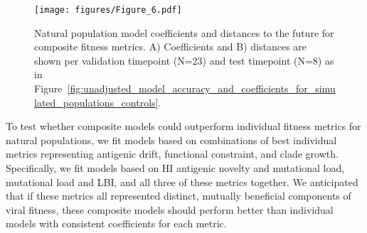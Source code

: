 \begin{figure}[htb]
  \texttt{[image: figures/Figure\_6.pdf]}
  \caption{
    Natural population model coefficients and distances to the future for composite fitness metrics.
    A) Coefficients and B) distances are shown per validation timepoint (N=23) and test timepoint (N=8) as in Figure~\ref{fig:unadjusted_model_accuracy_and_coefficients_for_simulated_populations_controls}.
  }
  \label{fig:unadjusted_composite_model_accuracy_and_coefficients_for_natural_populations}

  \label{figsupp:updated_model_accuracy_and_coefficients_for_natural_populations_across_test_data}

\end{figure}

To test whether composite models could outperform individual fitness metrics for natural populations, we fit models based on combinations of best individual metrics representing antigenic drift, functional constraint, and clade growth.
Specifically, we fit models based on HI antigenic novelty and mutational load, mutational load and LBI, and all three of these metrics together.
We anticipated that if these metrics all represented distinct, mutually beneficial components of viral fitness, these composite models should perform better than individual models with consistent coefficients for each metric.

